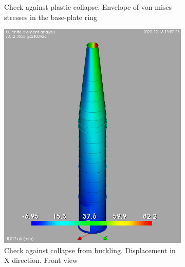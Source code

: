 \documentclass[a4paper,11pt ]{xc_webpage_project}
\begin{document}
\begin{figure}[h]
\begin{subfigure}[b]{0.30\textwidth}
  \caption{Check against plastic collapse. Envelope of von-mises stresses in the base-plate ring}
  \end{subfigure}
\hfill
  \begin{subfigure}[b]{0.33\textwidth}
  \centering
  \includegraphics[width=\textwidth]{figures//uX_01}
  \caption{Check against collapse from buckling. Displacement in X direction. Front view}
  \end{subfigure}
\hfill
  \begin{subfigure}[b]{0.25\textwidth}
  \centering

\end{subfigure}
\end{figure}
\end{document}
